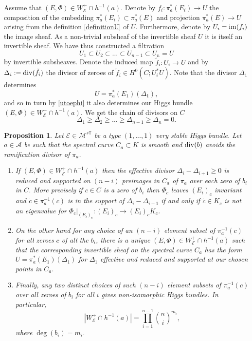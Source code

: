 \documentclass[12pt]{article}
\numberwithin{equation}{section}
\renewcommand{\div}{{\rm div}}
\newcommand{\im}{{\rm im}}
\newtheorem{proposition}[theorem]{Proposition}
\theoremstyle{remark}
\theoremstyle{definition}
\numberwithin{theorem}{section}
\def\calE{{\mathcal E}}
\def\M{{\mathcal{M}}}
\def\calA{{\mathcal{A}}}
\newcommand{\T}{{\mathbb{T}}}
\renewcommand{\1}{\mathbbm{1}}
\begin{document}
Assume that $(E,\Phi)\in W^+_\calE\cap h^{-1}(a).$  Denote by $f_i:\pi_a^*(E_i)\to U$ the composition of the  embedding $\pi_a^*(E_i)\subset \pi_a^*(E)$ and projection $\pi_a^*(E)\to U$ arising from the definition \eqref{definitionU} of $U$. Furthermore, denote by $U_i=\im(f_i)$ the image sheaf.  As a non-trivial  subsheaf of the invertible sheaf $U$ it is itself an invertible sheaf. We have thus constructed a filtration $$U_1\subset U_2\subset \dots\subset U_{n-1}\subset U_{n}=U$$ by invertible subsheaves. Denote  the induced map $\tilde{f}_i: U_i\to U$ and by $\Delta_i:=\div(\tilde{f}_i)$ the divisor of zeroes of $\tilde{f}_i\in H^0(C;U_i^*U)$. Note that the divisor $\Delta_1$ determines $$U=\pi_a^*(E_1)(\Delta_1),$$ and so in turn by \eqref{utoephi} it also determines our Higgs bundle $(E,\Phi)\in W^+_\calE\cap h^{-1}(a)$. We get the chain of divisors on $C$ $$\Delta_1\geq \Delta_2\geq \dots \geq \Delta_{n-1}\geq \Delta_n=0.$$ 

\begin{proposition} \label{vsintersect} Let $\calE\in \M^{s\T}$ be a type $(1,...,1)$ very stable Higgs bundle. Let $a\in \calA$ be such that the spectral curve $C_a\subset K$ is smooth and $\div(b)$ avoids the ramification divisor of $\pi_a$. \begin{enumerate} \item  If $(E,\Phi)\in W^+_\calE\cap h^{-1}(a)$ then the effective divisor $\Delta_i-\Delta_{i+1}\geq 0$ is reduced and supported on  $(n-i)$ preimages in $C_a$ of $\pi_a$ over each zero of $b_i$ in $C$. More precisely if $c\in C$ is a zero of $b_i$ then $\Phi_c$ leaves $(E_i)_c$ invariant and  $\tilde{c}\in \pi_a^{-1}({c})$ is in the support of $\Delta_i-\Delta_{i+1}$ if and only if $\tilde{c}\in K_c$ is not an eigenvalue for $\Phi_c|_{(E_i)_c}:(E_i)_c\to(E_i)_c K_c $. 
		
		\item 	On the other hand for any choice of an $(n-i)$ element subset of $\pi_a^{-1}(c)$ for all zeroes $c$ of all the $b_i$, there is a unique $(E,\Phi)\in W_\calE^+\cap h^{-1}(a)$ such that the corresponding invertible sheaf on the spectral curve $C_a$ has the form $U=\pi_a^*(E_1)(\Delta_1)$ for $\Delta_1$ effective and reduced and supported at our chosen points in $C_a$. 
		
		\item	Finally, any two distinct choices of such $(n-i)$ element subsets of $\pi_a^{-1}(c)$ over all zeroes of $b_i$ for all $i$ gives non-isomorphic Higgs bundles. In particular, $$|W^+_\calE\cap h^{-1}(a)|= \prod_{i=1}^{n-1}{n\choose i}	^{m_i},$$ where $\deg(b_i)=m_i$. \end{enumerate}	\end{proposition}
\end{document}

